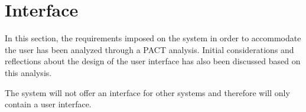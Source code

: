 \section{Interface}\label{sc:interface}
In this section, the requirements imposed on the system in order to accommodate the user has been analyzed through a PACT analysis. Initial considerations and reflections about the design of the user interface has also been discussed based on this analysis. \par
The system will not offer an interface for other systems and therefore will only contain a user interface.
\par